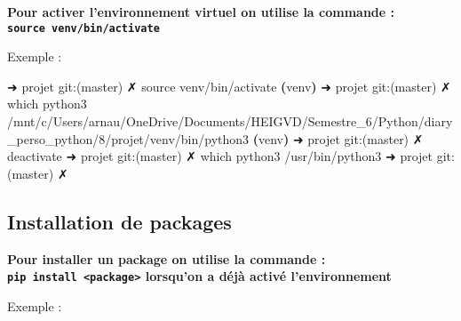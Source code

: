 \documentclass[11pt]{article}
\newenvironment{Shaded}{}{}
\newcommand{\KeywordTok}[1]{\textcolor[rgb]{0.00,0.44,0.13}{\textbf{{#1}}}}
\newcommand{\FunctionTok}[1]{\textcolor[rgb]{0.02,0.16,0.49}{{#1}}}
\newcommand{\NormalTok}[1]{{#1}}
\newcommand{\BuiltInTok}[1]{{#1}}
\newcommand{\ExtensionTok}[1]{{#1}}
\begin{document}
\textbf{Pour activer l'environnement virtuel on utilise la commande :
\texttt{source\ venv/bin/activate}}

Exemple :

\begin{Shaded}
\begin{Highlighting}[]
\NormalTok{➜  }\ExtensionTok{projet}\NormalTok{ git:(master) ✗ }\BuiltInTok{source}\NormalTok{ venv/bin/activate}
\KeywordTok{(}\ExtensionTok{venv}\KeywordTok{)}\NormalTok{ ➜  }\ExtensionTok{projet}\NormalTok{ git:(master) ✗ }\FunctionTok{which}\NormalTok{ python3}
\ExtensionTok{/mnt/c/Users/arnau/OneDrive/Documents/HEIGVD/Semestre_6/Python/diary_perso_python/8/projet/venv/bin/python3}
\KeywordTok{(}\ExtensionTok{venv}\KeywordTok{)}\NormalTok{ ➜  }\ExtensionTok{projet}\NormalTok{ git:(master) ✗ }\ExtensionTok{deactivate}
\NormalTok{➜  }\ExtensionTok{projet}\NormalTok{ git:(master) ✗ }\FunctionTok{which}\NormalTok{ python3}
\ExtensionTok{/usr/bin/python3}
\NormalTok{➜  }\ExtensionTok{projet}\NormalTok{ git:(master) ✗}
\end{Highlighting}
\end{Shaded}

\hypertarget{installation-de-packages}{%
\subsection{Installation de packages}\label{installation-de-packages}}

\textbf{Pour installer un package on utilise la commande :
\texttt{pip\ install\ \textless{}package\textgreater{}} lorsqu'on a déjà
activé l'environnement}

Exemple :
\end{document}
